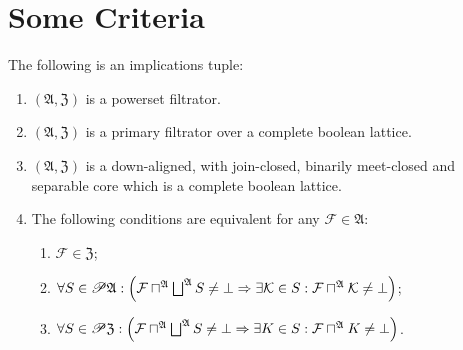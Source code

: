 \section{Some Criteria}
\begin{thm}
\label{crit1}The following is an implications tuple:
\begin{enumerate}
\item \label{crit1-p}$(\mathfrak{A},\mathfrak{Z})$ is a powerset filtrator.
\item \label{crit1-f}$(\mathfrak{A},\mathfrak{Z})$ is a primary filtrator
over a complete boolean lattice.
\item \label{crit1-fltr}$(\mathfrak{A},\mathfrak{Z})$ is a down-aligned,
with join-closed, binarily meet-closed and separable core which is
a complete boolean lattice.
\item \label{crit1-conc}The following conditions are equivalent for any
$\mathcal{F}\in\mathfrak{A}$:

\begin{enumerate}
\item \label{crit1-core}$\mathcal{F}\in\mathfrak{Z}$;
\item \label{crit1-flt}$\forall S\in\subsets\mathfrak{A}:\left(\mathcal{F}\sqcap^{\mathfrak{A}}\bigsqcup^{\mathfrak{A}}S\ne\bot\Rightarrow\exists\mathcal{K}\in S:\mathcal{F}\sqcap^{\mathfrak{A}}\mathcal{K}\ne\bot\right)$;
\item \label{crit1-princ}$\forall S\in\subsets\mathfrak{Z}:\left(\mathcal{F}\sqcap^{\mathfrak{A}}\bigsqcup^{\mathfrak{A}}S\ne\bot\Rightarrow\exists K\in S:\mathcal{F}\sqcap^{\mathfrak{A}}K\ne\bot\right)$.
\end{enumerate}
\end{enumerate}
\end{thm}
